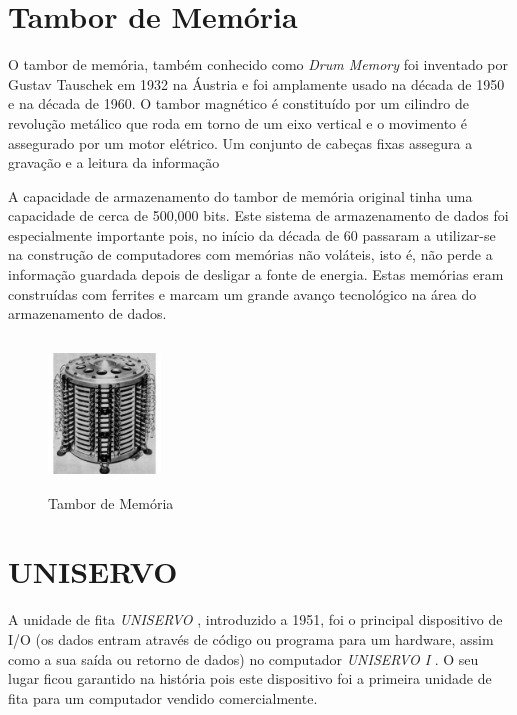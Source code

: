 \documentclass{report}
\begin{document}
		
		\section{Tambor de Memória}
		 O tambor de memória, também conhecido como\textit{ Drum Memory} foi inventado por Gustav Tauschek em 1932 na Áustria e foi amplamente usado na década de 1950 e na década de 1960.
		 O tambor magnético é constituído por um cilindro de revolução metálico que roda em torno de um eixo vertical e o movimento é assegurado por um motor elétrico. Um conjunto de cabeças fixas assegura a gravação e a leitura da informação
		 
		 A capacidade de armazenamento do tambor de memória original tinha uma capacidade de cerca de 500,000 bits. Este sistema de armazenamento de dados foi especialmente importante pois, no início da década de 60 passaram a utilizar-se na construção de computadores com memórias não voláteis, isto é, não perde a informação guardada depois de desligar a fonte de energia. Estas memórias eram construídas com ferrites e marcam um grande avanço tecnológico na área do armazenamento de dados.
	
	\begin{figure}[b]
		\centering
		\includegraphics[width=3cm, height=4cm]{tambordememoria.jpg}
		\caption{Tambor de Memória}
		\end{figure}

\newpage

	\section{UNISERVO}

	A unidade de fita \textit{UNISERVO}  , introduzido a 1951, foi o principal dispositivo de I/O (os dados entram através de código ou programa para um hardware, assim como a sua saída ou retorno de dados) no computador \textit{UNISERVO I} . O seu lugar ficou garantido na história pois este dispositivo foi a primeira unidade de fita para um computador vendido comercialmente. 
\vspace{1mm}	
	
\end{document}
